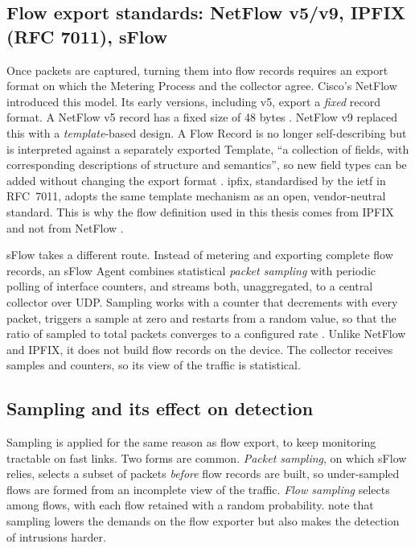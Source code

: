\subsection{Flow export standards: NetFlow v5/v9, IPFIX (RFC 7011), sFlow}
\label{sec:flow-export-standards}

Once packets are captured, turning them into flow records requires an export
format on which the Metering Process and the collector agree. Cisco's
NetFlow introduced this model. Its early versions, including v5, export a
\emph{fixed} record format. A NetFlow v5 record has a fixed size of 48 bytes
\citep{sperotto2010flowbased}. NetFlow v9 replaced this with a
\emph{template}-based design. A Flow Record is no longer self-describing but
is interpreted against a separately exported Template, ``a collection of
fields, with corresponding descriptions of structure and semantics'', so new
field types can be added without changing the export format
\citep{claise2004rfc3954}. \gls{ipfix}, standardised by the \gls{ietf} in
RFC~7011, adopts the same template mechanism as an open, vendor-neutral
standard. This is why the flow definition used in this thesis comes from
IPFIX and not from NetFlow \citep{claise2013rfc7011}.

sFlow takes a different route. Instead of metering and exporting complete
flow records, an sFlow Agent combines statistical \emph{packet sampling}
with periodic polling of interface counters, and streams both, unaggregated,
to a central collector over UDP. Sampling works with a counter that
decrements with every packet, triggers a sample at zero and restarts from a
random value, so that the ratio of sampled to total packets converges to a
configured rate \citep{phaal2001rfc3176}. Unlike NetFlow and IPFIX, it does
not build flow records on the device. The collector receives samples and
counters, so its view of the traffic is statistical.

\subsection{Sampling and its effect on detection}
\label{sec:sampling-detection-effect}

Sampling is applied for the same reason as flow export, to keep monitoring
tractable on fast links. Two forms are common. \emph{Packet sampling}, on
which sFlow relies, selects a subset of packets \emph{before} flow records
are built, so under-sampled flows are formed from an incomplete view of the
traffic. \emph{Flow sampling} selects among flows, with each flow retained
with a random probability. \citet{sperotto2010flowbased} note that
sampling lowers the demands on the flow exporter but also makes the
detection of intrusions harder.

